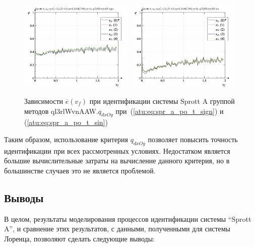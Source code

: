 \begin{figure}[htb!]
  \centerline{
    \includegraphics[width=0.49\textwidth]{p/cha/spr_a/ql3rlWvnAAW_dxOy/sprott_a_id2-p_v_f_sign.png}
    \hfill
    \includegraphics[width=0.49\textwidth]{p/cha/spr_a/ql3rlWvnAAW_dxOy/sprott_a_id2-p_v_f_sin.png}
  }
  \caption{Зависимости $\overline{e}(v_f)$ при идентификации системы Sprott A группой методов ql3rlWvnAAW.$q_{dxOy}$
   при~(\ref{atu:eq:spr_a_po_t_sign}) и (\ref{atu:eq:spr_a_po_t_sin})}
  \label{atu:f:spr_a_v_f_ql3rlWvnAAW_q_dxOy}
\end{figure}

Таким образом, использование критерия $q_{dxOy}$
позволяет повысить точность идентификации при всех рассмотренных
условиях. Недостатком является большие вычислительные затраты
на вычисление данного критерия, но в большинстве случаев это не является проблемой.



\subsection{Выводы}  %

В целом, результаты моделирования процессов идентификации системы ``Sprott A'',
и сравнение этих результатов, с данными, полученными
для системы Лоренца, позволяют сделать следующие выводы:

